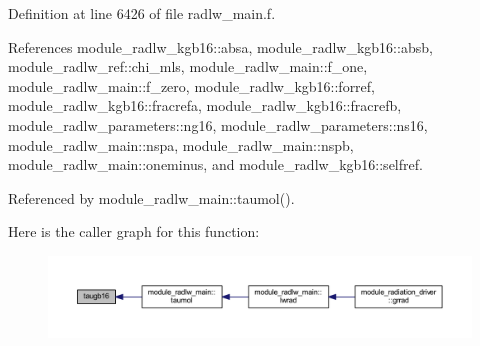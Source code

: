 Definition at line 6426 of file radlw\+\_\+main.\+f.



References module\+\_\+radlw\+\_\+kgb16\+::absa, module\+\_\+radlw\+\_\+kgb16\+::absb, module\+\_\+radlw\+\_\+ref\+::chi\+\_\+mls, module\+\_\+radlw\+\_\+main\+::f\+\_\+one, module\+\_\+radlw\+\_\+main\+::f\+\_\+zero, module\+\_\+radlw\+\_\+kgb16\+::forref, module\+\_\+radlw\+\_\+kgb16\+::fracrefa, module\+\_\+radlw\+\_\+kgb16\+::fracrefb, module\+\_\+radlw\+\_\+parameters\+::ng16, module\+\_\+radlw\+\_\+parameters\+::ns16, module\+\_\+radlw\+\_\+main\+::nspa, module\+\_\+radlw\+\_\+main\+::nspb, module\+\_\+radlw\+\_\+main\+::oneminus, and module\+\_\+radlw\+\_\+kgb16\+::selfref.



Referenced by module\+\_\+radlw\+\_\+main\+::taumol().



Here is the caller graph for this function\+:\nopagebreak
\begin{figure}[H]
\begin{center}
\leavevmode
\includegraphics[width=350pt]{radlw__main_8f_a942ce0031745cd1b3b4ebc3915970554_icgraph}
\end{center}
\end{figure}


